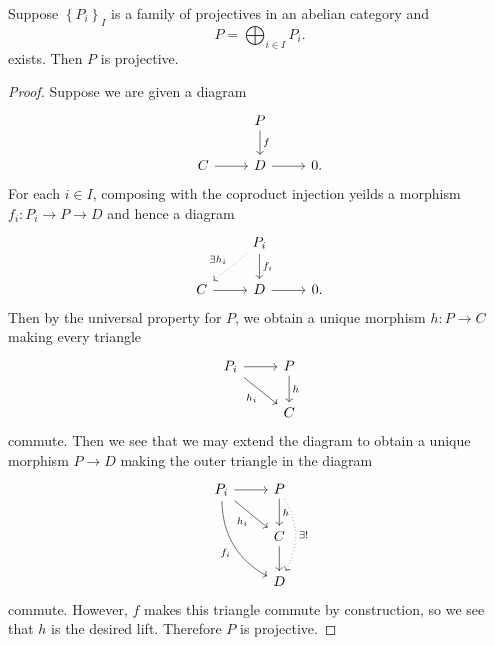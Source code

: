 \documentclass[10pt]{amsart}
\begin{document}
\begin{lem}\label{lem11}
  Suppose $\left\{P_i\right\}_I$ is a family of projectives in an abelian category and
  $$P = \bigoplus_{i \in I} P_i.$$
  exists.
  Then $P$ is projective.
  
  \begin{proof}
    Suppose we are given a diagram
    $$\begin{tikzcd}
      & P \arrow{d}{f} &\\
      C \arrow{r} & D \arrow{r} & 0.
    \end{tikzcd}$$
    For each $i \in I$, composing with the coproduct injection yeilds a morphism $f_i : P_i \rightarrow P \rightarrow D$ and hence a diagram
    $$\begin{tikzcd}
      & P_i \arrow{d}{f_i}\arrow[dotted,swap]{ld}{\exists h_i} &\\
      C \arrow{r} & D \arrow{r} & 0.
    \end{tikzcd}$$
    Then by the universal property for $P$, we obtain a unique morphism $h : P \rightarrow C$ making every triangle
    $$\begin{tikzcd}
      P_i \arrow{r}\arrow[swap]{rd}{h_i} & P \arrow{d}{h}\\
      & C
    \end{tikzcd}$$
    commute.
    Then we see that we may extend the diagram to obtain a unique morphism $P \rightarrow D$ making the outer triangle in the diagram
    $$\begin{tikzcd}
      P_i \arrow[swap,bend right]{rdd}{f_i} \arrow{r}\arrow[swap]{rd}{h_i} & P \arrow{d}{h}\arrow[dotted, bend left]{dd}{\exists !}\\
      & C \arrow{d}\\
      & D
    \end{tikzcd}$$
    commute.
    However, $f$ makes this triangle commute by construction, so we see that $h$ is the desired lift.
    Therefore $P$ is projective.
  \end{proof}
\end{lem}
\end{document}
